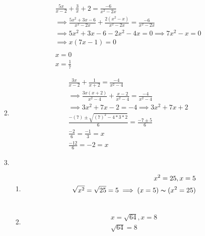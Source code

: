 \documentclass{article}
\begin{document}
\begin{enumerate}
	      \begin{align}
		      \frac{5x}{x - 2} + \frac{3}{x} + 2 = \frac{ - 6}{x^2 - 2x} \\
		      \implies \frac{5x^2 + 3x - 6}{x^2 - 2x} + \frac{2(x^2 - x)}{x^2 - 2x}
		      = \frac{ - 6}{x^2 - 2x}                                    \\
		      \implies 5x^2 + 3x - 6 - 2x^2 - 4x = 0
		      \implies 7x^2 - x = 0                                      \\
		      \implies x(7x - 1) = 0                                     \\\\
		      x = 0                                                      \\
		      x = \frac{1}{7}
	      \end{align}
	\item
	      \begin{align}
		      \frac{3x}{x - 2} + \frac{1}{x + 2} = \frac{ - 4}{x^2 - 4}                         \\
		      \implies \frac{3x(x + 2)}{x^2 - 4} + \frac{x - 2}{x^2 - 4} = \frac{ - 4}{x^2 - 4} \\
		      \implies 3x^2 + 7x - 2 =  - 4
		      \implies 3x^2 + 7x + 2                                                            \\
		      \frac{ - (7) \pm \sqrt{(7)^2 - 4*3*2}}{6}
		      = \frac{ - 7 \pm 5}{6}                                                            \\
		      \frac{ - 2}{6} = \frac{ - 1}{3} = x                                               \\
		      \frac{ - 12}{6} =  - 2 = x
	      \end{align}
	\item
	      \begin{enumerate}
		      \item
		            \begin{align}
			            x^2 = 25,x = 5                      \\
			            \sqrt{x^2} = \sqrt{25} = 5
			            \implies (x = 5)\thicksim(x^2 = 25) \\\\
		            \end{align}
		      \item
		            \begin{align}
			            x = \sqrt{64},x = 8 \\
			            \sqrt{64} = 8

\end{align}
\end{enumerate}
\end{enumerate}
\end{document}
